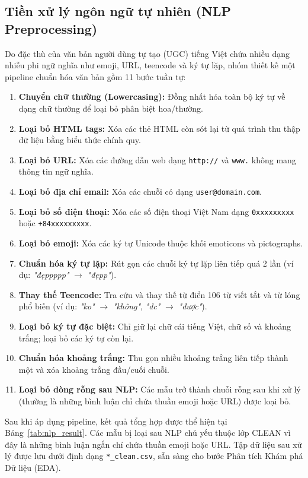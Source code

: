 \subsection{Tiền xử lý ngôn ngữ tự nhiên (NLP Preprocessing)}
Do đặc thù của văn bản người dùng tự tạo (UGC) tiếng Việt chứa nhiều dạng nhiễu phi ngữ nghĩa như emoji, URL, teencode và ký tự lặp, nhóm thiết kế một pipeline chuẩn hóa văn bản gồm 11 bước tuần tự:

\begin{enumerate}
    \item \textbf{Chuyển chữ thường (Lowercasing):} Đồng nhất hóa toàn bộ ký tự về dạng chữ thường để loại bỏ phân biệt hoa/thường.
    \item \textbf{Loại bỏ HTML tags:} Xóa các thẻ HTML còn sót lại từ quá trình thu thập dữ liệu bằng biểu thức chính quy.
    \item \textbf{Loại bỏ URL:} Xóa các đường dẫn web dạng \texttt{http://} và \texttt{www.} không mang thông tin ngữ nghĩa.
    \item \textbf{Loại bỏ địa chỉ email:} Xóa các chuỗi có dạng \texttt{user@domain.com}.
    \item \textbf{Loại bỏ số điện thoại:} Xóa các số điện thoại Việt Nam dạng \texttt{0xxxxxxxxx} hoặc \texttt{+84xxxxxxxxx}.
    \item \textbf{Loại bỏ emoji:} Xóa các ký tự Unicode thuộc khối emoticons và pictographs.
    \item \textbf{Chuẩn hóa ký tự lặp:} Rút gọn các chuỗi ký tự lặp liên tiếp quá 2 lần (ví dụ: \textit{"đẹppppp"} $\rightarrow$ \textit{"đẹpp"}).
    \item \textbf{Thay thế Teencode:} Tra cứu và thay thế từ điển 106 từ viết tắt và từ lóng phổ biến (ví dụ: \textit{"ko"} $\rightarrow$ \textit{"không"}, \textit{"dc"} $\rightarrow$ \textit{"được"}).
    \item \textbf{Loại bỏ ký tự đặc biệt:} Chỉ giữ lại chữ cái tiếng Việt, chữ số và khoảng trắng; loại bỏ các ký tự còn lại.
    \item \textbf{Chuẩn hóa khoảng trắng:} Thu gọn nhiều khoảng trắng liên tiếp thành một và xóa khoảng trắng đầu/cuối chuỗi.
    \item \textbf{Loại bỏ dòng rỗng sau NLP:} Các mẫu trở thành chuỗi rỗng sau khi xử lý (thường là những bình luận chỉ chứa thuần emoji hoặc URL) được loại bỏ.
\end{enumerate}

Sau khi áp dụng pipeline, kết quả tổng hợp được thể hiện tại Bảng~\ref{tab:nlp_result}. Các mẫu bị loại sau NLP chủ yếu thuộc lớp CLEAN vì đây là những bình luận ngắn chỉ chứa thuần emoji hoặc URL. Tập dữ liệu sau xử lý được lưu dưới định dạng \texttt{*\_clean.csv}, sẵn sàng cho bước Phân tích Khám phá Dữ liệu (EDA).

